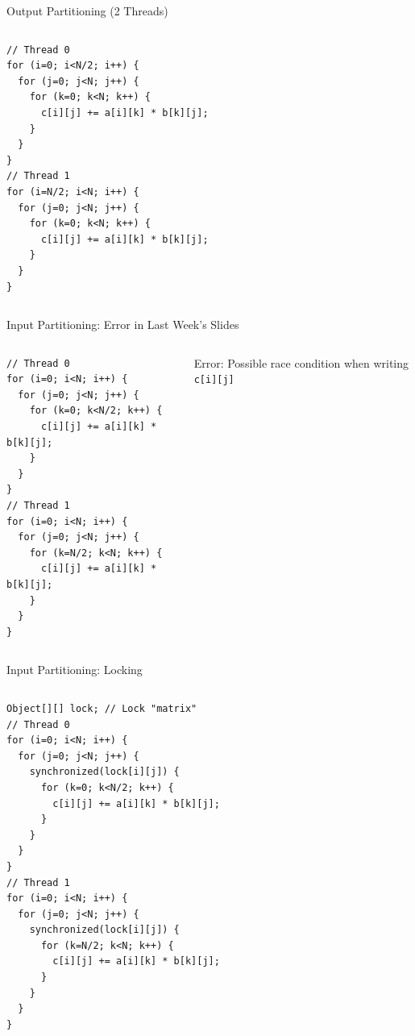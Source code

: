 \begin{frame}[fragile]{Output Partitioning (2 Threads)}
  \begin{columns}[c]
    \begin{column}{0.75\textwidth}
\begin{lstlisting}[basicstyle=\fontsize{11}{13}\selectfont\ttfamily]
// Thread 0
for (i=0; i<N/2; i++) {
  for (j=0; j<N; j++) {
    for (k=0; k<N; k++) {
      c[i][j] += a[i][k] * b[k][j];
    }
  }
}
// Thread 1
for (i=N/2; i<N; i++) {
  for (j=0; j<N; j++) {
    for (k=0; k<N; k++) {
      c[i][j] += a[i][k] * b[k][j];
    }
  }
}
\end{lstlisting}
    \end{column}
    \begin{column}{0.25\textwidth}
    \end{column}
  \end{columns}  
\end{frame}

\begin{frame}[fragile]{Input Partitioning: Error in Last Week's Slides}
  \begin{columns}[c]
    \begin{column}{0.75\textwidth}
\begin{lstlisting}[basicstyle=\fontsize{11}{13}\selectfont\ttfamily]
// Thread 0
for (i=0; i<N; i++) {
  for (j=0; j<N; j++) {
    for (k=0; k<N/2; k++) {
      c[i][j] += a[i][k] * b[k][j];
    }
  }
}
// Thread 1
for (i=0; i<N; i++) {
  for (j=0; j<N; j++) {
    for (k=N/2; k<N; k++) {
      c[i][j] += a[i][k] * b[k][j];
    }
  }
}
\end{lstlisting}      
    \end{column}
    \begin{column}{0.25\textwidth}
      \pause

      \alert{Error:} Possible race condition when writing
      \lstinline!c[i][j]!
    \end{column}
  \end{columns}
\end{frame}

\begin{frame}[fragile]{Input Partitioning: Locking}
  \begin{columns}[c]
    \begin{column}{0.75\textwidth}
\begin{lstlisting}[basicstyle=\fontsize{8}{10}\selectfont\ttfamily]
Object[][] lock; // Lock "matrix"
// Thread 0
for (i=0; i<N; i++) {
  for (j=0; j<N; j++) {
    synchronized(lock[i][j]) {
      for (k=0; k<N/2; k++) {
        c[i][j] += a[i][k] * b[k][j];
      }
    }
  }
}
// Thread 1
for (i=0; i<N; i++) {
  for (j=0; j<N; j++) {
    synchronized(lock[i][j]) {
      for (k=N/2; k<N; k++) {
        c[i][j] += a[i][k] * b[k][j];
      }
    }
  }
}
\end{lstlisting}
    \end{column}
    \begin{column}{0.25\textwidth}
    \end{column}
  \end{columns}
\end{frame}


